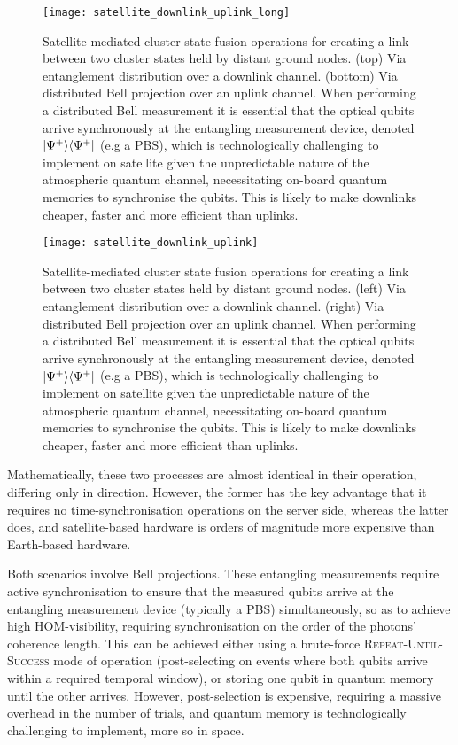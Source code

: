 \doublecol
	\begin{figure}[!htbp]
		\texttt{[image: satellite\_downlink\_uplink\_long]}
		\captionspacefig \caption{Satellite-mediated cluster state fusion operations for creating a link between two cluster states held by distant ground nodes. (top) Via entanglement distribution over a downlink channel. (bottom) Via distributed Bell projection over an uplink channel. When performing a distributed Bell measurement it is essential that the optical qubits arrive synchronously at the entangling measurement device, denoted \mbox{$|\Psi^+\rangle\langle\Psi^+|$} (e.g a PBS), which is technologically challenging to implement on satellite given the unpredictable nature of the atmospheric quantum channel, necessitating on-board quantum memories to synchronise the qubits. This is likely to make downlinks cheaper, faster and more efficient than uplinks.} \label{fig:sat_up_down}
	\end{figure}
\else
	\begin{figure*}[!htbp]
		\texttt{[image: satellite\_downlink\_uplink]}
		\captionspacefig \caption{Satellite-mediated cluster state fusion operations for creating a link between two cluster states held by distant ground nodes. (left) Via entanglement distribution over a downlink channel. (right) Via distributed Bell projection over an uplink channel. When performing a distributed Bell measurement it is essential that the optical qubits arrive synchronously at the entangling measurement device, denoted \mbox{$|\Psi^+\rangle\langle\Psi^+|$} (e.g a PBS), which is technologically challenging to implement on satellite given the unpredictable nature of the atmospheric quantum channel, necessitating on-board quantum memories to synchronise the qubits. This is likely to make downlinks cheaper, faster and more efficient than uplinks.} \label{fig:sat_up_down}
	\end{figure*}
\fi

Mathematically, these two processes are almost identical in their operation, differing only in direction. However, the former has the key advantage that it requires no time-synchronisation operations on the server side, whereas the latter does, and satellite-based hardware is orders of magnitude more expensive than Earth-based hardware.

Both scenarios involve Bell projections. These entangling measurements require active synchronisation to ensure that the measured qubits arrive at the entangling measurement device (typically a PBS) simultaneously, so as to achieve high HOM-visibility, requiring synchronisation on the order of the photons' coherence length. This can be achieved either using a brute-force \textsc{Repeat-Until-Success} mode of operation (post-selecting on events where both qubits arrive within a required temporal window), or storing one qubit in quantum memory until the other arrives. However, post-selection is expensive, requiring a massive overhead in the number of trials, and quantum memory is technologically challenging to implement, more so in space.

